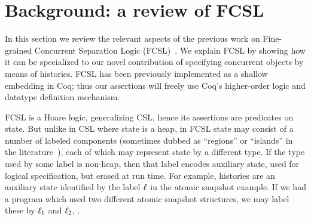 \section{Background: a review of FCSL}
\label{sec:background}
In this section we review the relevant aspects of the previous work on
Fine-grained Concurrent Separation Logic
(FCSL)~\cite{Nanevski-al:ESOP14}. We explain FCSL by showing how it
can be specialized to our novel contribution of specifying concurrent
objects by means of histories. FCSL has been previously implemented as
a shallow embedding in Coq; thus our assertions will freely use Coq's
higher-order logic and datatype definition mechanism.
%

%

FCSL is a Hoare logic, generalizing CSL, hence its assertions are
predicates on state. But unlike in CSL where state is a heap, in FCSL
state may consist of a number of labeled components (sometimes dubbed
as ``regions'' or ``islands'' in the
literature~\cite{DinsdaleYoung-al:ECOOP10,Svendsen-Birkedal:ESOP14,Turon-al:ICFP13}),
each of which may represent state by a different type. If the type
used by some label is non-heap, then that label encodes auxiliary
state, used for logical specification, but erased at run time. For
example, histories are an auxiliary state identified by the label
$\ell$ in the atomic snapshot example. If we had a program which used
two different atomic snapshot structures, we may label these by
$\ell_1$ and $\ell_2$, \etc.

